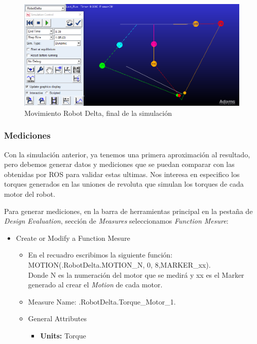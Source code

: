     \begin{figure}[H]
        \centering
        \includegraphics[width=1\linewidth]{Main/Chapter6/Images6/adams/motions/simulacion_final.png}
        \caption{Movimiento Robot Delta, final de la simulación}
        \label{f:Cap6_adams_motions_pt2}
    \end{figure}
    
    
    \subsubsection{Mediciones}
    
    Con la simulación anterior, ya tenemos una primera aproximación al resultado, pero debemos generar datos y mediciones que se puedan comparar con las obtenidas por ROS para validar estas ultimas. Nos interesa en especifico los torques generados en las uniones de revoluta que simulan los torques de cada motor del robot.
    
    Para generar mediciones, en la barra de herramientas principal en la pestaña de \textit{Design Evaluation}, sección de \textit{Measures} seleccionamos \textit{Function Mesure}:
    
    \begin{scope}
        \renewcommand{\labelitemi}{\blacklozenge}
        \renewcommand{\labelitemii}{\checkmark}
        \begin{itemize}
            \item Create or Modify a Function Mesure
            \begin{itemize}
                \item En el recuadro escribimos la siguiente función: \\ MOTION(.RobotDelta.MOTION\_N, 0, 8,MARKER\_xx). \\ Donde N es la numeración del motor que se medirá y xx es el Marker generado al crear el \textit{Motion} de cada motor.
                \item Measure Name: .RobotDelta.Torque\_Motor\_1.
                \item General Attributes
                \begin{itemize}
                    \item \textbf{Units:} Torque
                \end{itemize}
            \end{itemize}
        \end{itemize}
    \end{scope}
    
